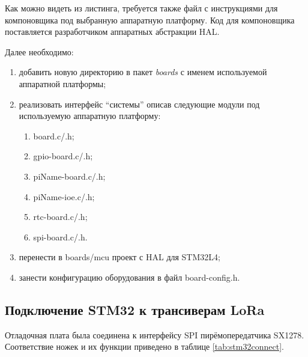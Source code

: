 Как можно видеть из листинга, требуется также файл с инструкциями для 
компоновщика под выбранную аппаратную платформу. Код для компоновщика 
поставляется разработчиком аппаратных абстракции HAL.

Далее необходимо:
\begin{enumerate}
 \item добавить новую директорию в пакет \textit{boards} с именем используемой 
аппаратной платформы;
 \item реализовать интерфейс ``системы'' описав следующие модули под 
используемую аппаратную платформу:
 \begin{enumerate}
  \item board.c/.h;
  \item gpio-board.c/.h;
  \item piName-board.c/.h;
  \item piName-ioe.c/.h;
  \item rtc-board.c/.h;
  \item spi-board.c/.h.
 \end{enumerate}
 \item перенести в boards/mcu проект с HAL для STM32L4;
 \item занести конфигурацию оборудования в файл board-config.h.
\end{enumerate}

\subsection{Подключение STM32 к трансиверам LoRa}

Отладочная плата была соединена к интерфейсу SPI пирёмопередатчика SX1278.
Соответствие ножек и их функции приведено в таблице \ref{tab:stm32connect}.

